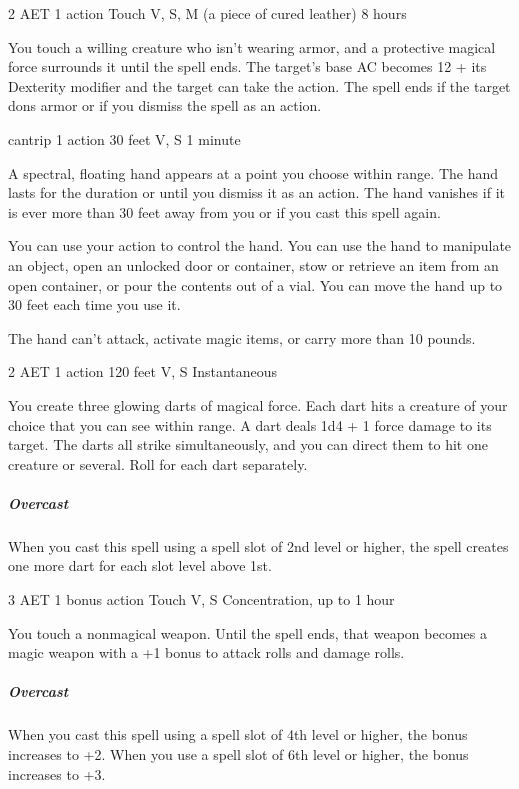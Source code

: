 \label{spell:mage-armor}
{2 AET}
{1 action}
{Touch}
{V, S, M (a piece of cured leather)}
{8 hours}

You touch a willing creature who isn't wearing armor, and a protective magical force surrounds it until the spell ends. The target's base AC becomes 12 + its Dexterity modifier and the target can take the  action. The spell ends if the target dons armor or if you dismiss the spell as an action.

\label{spell:mage-hand}
{cantrip}
{1 action}
{30 feet}
{V, S}
{1 minute}

A spectral, floating hand appears at a point you choose within range. The hand lasts for the duration or until you dismiss it as an action. The hand vanishes if it is ever more than 30 feet away from you or if you cast this spell again.

You can use your action to control the hand. You can use the hand to manipulate an object, open an unlocked door or container, stow or retrieve an item from an open container, or pour the contents out of a vial. You can move the hand up to 30 feet each time you use it.

The hand can't attack, activate magic items, or carry more than 10 pounds.

\label{spell:magic-missile}
{2 AET}
{1 action}
{120 feet}
{V, S}
{Instantaneous}

You create three glowing darts of magical force. Each dart hits a creature of your choice that you can see within range. A dart deals 1d4 + 1 force damage to its target. The darts all strike simultaneously, and you can direct them to hit one creature or several. Roll for each dart separately.

\subparagraph*{Overcast} When you cast this spell using a spell slot of 2nd level or higher, the spell creates one more dart for each slot level above 1st.

\label{spell:magic-weapon}
{3 AET}
{1 bonus action}
{Touch}
{V, S}
{Concentration, up to 1 hour}

You touch a nonmagical weapon. Until the spell ends, that weapon becomes a magic weapon with a +1 bonus to attack rolls and damage rolls.
\subparagraph*{Overcast} When you cast this spell using a spell slot of 4th level or higher, the bonus increases to +2. When you use a spell slot of 6th level or higher, the bonus increases to +3.

